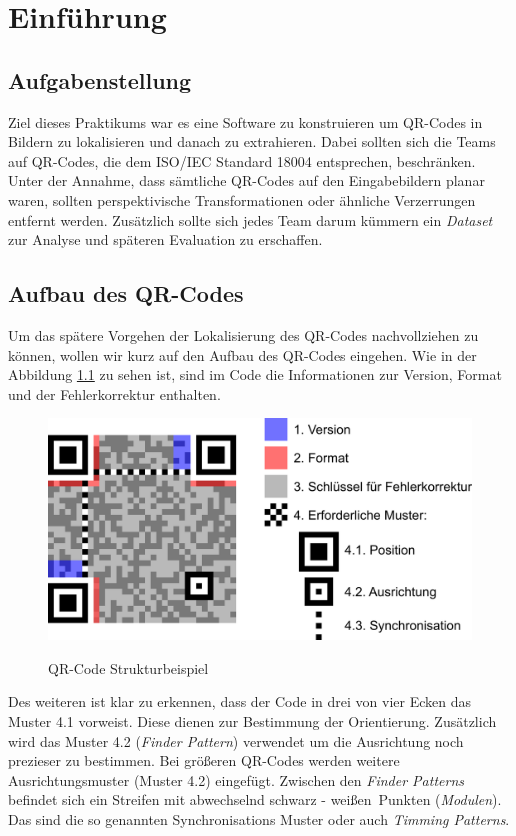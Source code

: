 \chapter{Einführung}
\section{Aufgabenstellung}
Ziel dieses Praktikums war es eine Software zu konstruieren um QR-Codes in Bildern zu lokalisieren und danach zu extrahieren.
Dabei sollten sich die Teams auf QR-Codes, die dem ISO/IEC Standard 18004 entsprechen, beschränken.
Unter der Annahme, dass sämtliche QR-Codes auf den Eingabebildern planar waren, sollten perspektivische Transformationen oder ähnliche Verzerrungen entfernt werden.
Zusätzlich sollte sich jedes Team darum kümmern ein \emph{Dataset} zur Analyse und späteren Evaluation zu erschaffen.
 
\section{Aufbau des QR-Codes}
Um das spätere Vorgehen der Lokalisierung des QR-Codes nachvollziehen zu können, wollen wir kurz auf den Aufbau des QR-Codes eingehen.
Wie in der Abbildung \ref{fig:struktur-qrcode} zu sehen ist, sind im Code die Informationen zur Version, Format und der Fehlerkorrektur enthalten. 

\begin{figure}[h]
\centering
\includegraphics[scale=0.3]{images/QR_Code_Struktur_Beispiel.png}
\label{fig:struktur-qrcode}\caption{QR-Code Strukturbeispiel}
\end{figure}

Des weiteren ist klar zu erkennen, dass der Code in drei von vier Ecken das Muster 4.1 vorweist. Diese dienen zur Bestimmung der Orientierung. Zusätzlich wird das Muster 4.2 (\emph{Finder Pattern}) verwendet um die Ausrichtung noch prezieser zu bestimmen. Bei größeren QR-Codes werden weitere Ausrichtungsmuster (Muster 4.2) eingefügt. Zwischen den \emph{Finder Patterns} befindet sich ein Streifen mit abwechselnd \glqq schwarz - weißen\grqq\  Punkten (\emph{Modulen}). Das sind die so genannten Synchronisations Muster oder auch \emph{Timming Patterns}.\\

